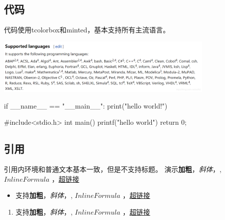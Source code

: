 \documentclass{article}
\begin{document}
\subsection{代码}


代码使用tcolorbox和minted，基本支持所有主流语言。
\begin{center}
\vspace{\baselineskip}\includegraphics[width=0.8\textwidth]{images/53bb9cd2ced62c6673f39073ca9397b7.png}\vspace{\baselineskip}
\end{center}


\begin{langbox}[Python]
if __name__ == "__main__":
    print("hello world!")
\end{langbox}



\begin{langbox}[C++]
#include<stdio.h>
int main(){
    printf("hello world")
    return 0;
}

\end{langbox}



\subsection{引用}


\begin{markquote}

引用内环境和普通文本基本一致，但是不支持标题。
演示\textbf{加粗}，\textit{斜体}，, $Inline Formula$ ，\href{http:///www.github.com}{超链接}




\begin{itemize}
\item
支持\textbf{加粗}，\textit{斜体}，, $Inline Formula$ ，\href{http:///www.github.com}{超链接}
\end{itemize}


\begin{enumerate}
\item
支持\textbf{加粗}，\textit{斜体}，, $Inline Formula$ ，\href{http:///www.github.com}{超链接}
\end{enumerate}







\end{markquote}
\end{document}
